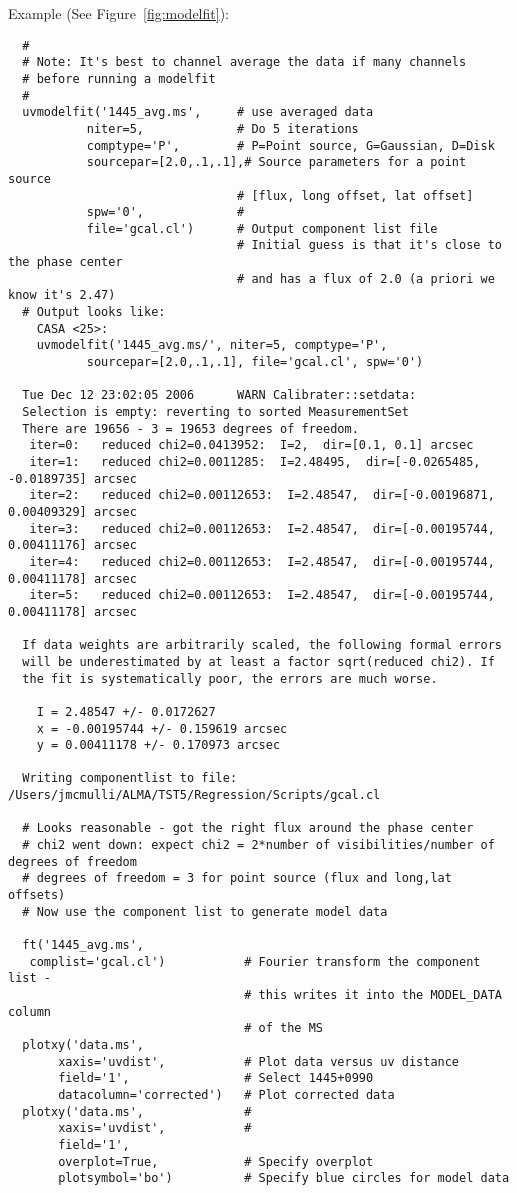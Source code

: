 Example (See Figure~\ref{fig:modelfit}):
\small
\begin{verbatim}
  #
  # Note: It's best to channel average the data if many channels
  # before running a modelfit
  #
  uvmodelfit('1445_avg.ms',     # use averaged data
           niter=5,             # Do 5 iterations
           comptype='P',        # P=Point source, G=Gaussian, D=Disk
           sourcepar=[2.0,.1,.1],# Source parameters for a point source
                                # [flux, long offset, lat offset]
           spw='0',             # 
           file='gcal.cl')      # Output component list file
                                # Initial guess is that it's close to the phase center
                                # and has a flux of 2.0 (a priori we know it's 2.47)
  # Output looks like:
    CASA <25>:
    uvmodelfit('1445_avg.ms/', niter=5, comptype='P',
           sourcepar=[2.0,.1,.1], file='gcal.cl', spw='0') 

  Tue Dec 12 23:02:05 2006      WARN Calibrater::setdata:
  Selection is empty: reverting to sorted MeasurementSet
  There are 19656 - 3 = 19653 degrees of freedom.
   iter=0:   reduced chi2=0.0413952:  I=2,  dir=[0.1, 0.1] arcsec
   iter=1:   reduced chi2=0.0011285:  I=2.48495,  dir=[-0.0265485, -0.0189735] arcsec
   iter=2:   reduced chi2=0.00112653:  I=2.48547,  dir=[-0.00196871, 0.00409329] arcsec
   iter=3:   reduced chi2=0.00112653:  I=2.48547,  dir=[-0.00195744, 0.00411176] arcsec
   iter=4:   reduced chi2=0.00112653:  I=2.48547,  dir=[-0.00195744, 0.00411178] arcsec
   iter=5:   reduced chi2=0.00112653:  I=2.48547,  dir=[-0.00195744, 0.00411178] arcsec

  If data weights are arbitrarily scaled, the following formal errors
  will be underestimated by at least a factor sqrt(reduced chi2). If 
  the fit is systematically poor, the errors are much worse.

    I = 2.48547 +/- 0.0172627
    x = -0.00195744 +/- 0.159619 arcsec
    y = 0.00411178 +/- 0.170973 arcsec

  Writing componentlist to file: /Users/jmcmulli/ALMA/TST5/Regression/Scripts/gcal.cl

  # Looks reasonable - got the right flux around the phase center
  # chi2 went down: expect chi2 = 2*number of visibilities/number of degrees of freedom
  # degrees of freedom = 3 for point source (flux and long,lat offsets)
  # Now use the component list to generate model data

  ft('1445_avg.ms',  
   complist='gcal.cl')           # Fourier transform the component list -
                                 # this writes it into the MODEL_DATA column
                                 # of the MS
  plotxy('data.ms',
       xaxis='uvdist',           # Plot data versus uv distance
       field='1',                # Select 1445+0990
       datacolumn='corrected')   # Plot corrected data
  plotxy('data.ms',              #
       xaxis='uvdist',           #
       field='1', 
       overplot=True,            # Specify overplot
       plotsymbol='bo')          # Specify blue circles for model data
\end{verbatim}
\normalsize

